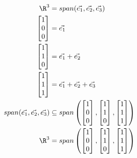 \documentclass{math}
\begin{document}
\begin{align*}
  \R^3 &= span(\vec{e_1},\vec{e_2},\vec{e_3}) \\
  \begin{bmatrix}1 \\ 0 \\ 0\end{bmatrix} &= \vec{e_1} \\
  \begin{bmatrix}1 \\ 1 \\ 0\end{bmatrix} &= \vec{e_1}+\vec{e_2} \\
  \begin{bmatrix}1 \\ 1 \\ 1\end{bmatrix} &= \vec{e_1}+\vec{e_2}+\vec{e_3} \\
  span(\vec{e_1},\vec{e_2},\vec{e_3}) &\subseteq span\left(
    \begin{bmatrix}1 \\ 0 \\ 0\end{bmatrix},
    \begin{bmatrix}1 \\ 1 \\ 0\end{bmatrix},
    \begin{bmatrix}1 \\ 1 \\ 1\end{bmatrix}\right) \\
  \R^3 &= span\left(
    \begin{bmatrix}1 \\ 0 \\ 0\end{bmatrix},
    \begin{bmatrix}1 \\ 1 \\ 0\end{bmatrix},
    \begin{bmatrix}1 \\ 1 \\ 1\end{bmatrix}\right)
\end{align*}
\end{document}

